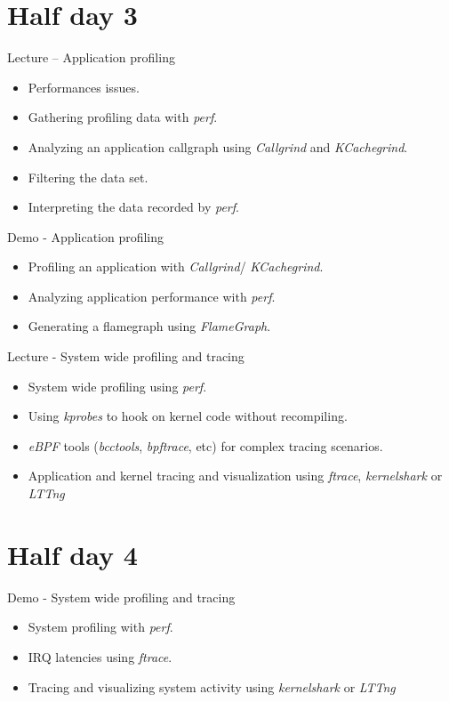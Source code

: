 \documentclass[a4paper,12pt,obeyspaces,spaces,hyphens]{article}
\begin{document}
\section{Half day 3}

\feagendatwocolumn
{Lecture – Application profiling}
{
  \begin{itemize}
  \item Performances issues.
  \item Gathering profiling data with {\em perf}.
  \item Analyzing an application callgraph using {\em Callgrind}
    and {\em KCachegrind}.
  \item Filtering the data set.
  \item Interpreting the data recorded by {\em perf}.
  \end{itemize}
}
{Demo - Application profiling}
{
  \begin{itemize}
  \item Profiling an application with {\em Callgrind}/{\em
      KCachegrind}.
  \item Analyzing application performance with {\em perf}.
  \item Generating a flamegraph using {\em FlameGraph}.
  \end{itemize}
}

\feagendaonecolumn
{Lecture - System wide profiling and tracing}
{
  \begin{itemize}
  \item System wide profiling using {\em perf}.
  \item Using {\em kprobes} to hook on kernel code without
    recompiling.
  \item {\em eBPF} tools ({\em bcctools}, {\em bpftrace}, etc) for
    complex tracing scenarios.
  \item Application and kernel tracing and visualization using {\em
      ftrace}, {\em kernelshark} or {\em LTTng}
  \end{itemize}
}

\section{Half day 4}

\feagendaonecolumn
{Demo - System wide profiling and tracing}
{
  \begin{itemize}
  \item System profiling with {\em perf}.
  \item IRQ latencies using {\em ftrace}.
  \item Tracing and visualizing system activity using {\em
      kernelshark} or {\em LTTng}
  \end{itemize}
}
\end{document}
